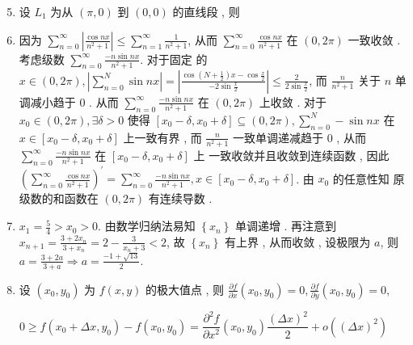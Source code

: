 \documentclass[10pt]{article}
\begin{document}
\begin{enumerate}
  \setcounter{enumi}{4}
  \item  设  $L_{1}$  为从  $(\pi, 0)$  到  $(0,0)$  的直线段 ,  则 

  \item  因为  $\sum_{n=0}^{\infty}\left|\frac{\cos n x}{n^{2}+1}\right| \leqslant \sum_{n=1}^{\infty} \frac{1}{n^{2}+1}$,  从而  $\sum_{n=0}^{\infty} \frac{\cos n x}{n^{2}+1}$  在  $(0,2 \pi)$  一致收敛 .  考虑级数  $\sum_{n=0}^{\infty} \frac{-n \sin n x}{n^{2}+1}$.  对于固定   的  $x \in(0,2 \pi),\left|\sum_{n=0}^{N} \sin n x\right|=\left|\frac{\cos \left(N+\frac{1}{2}\right) x-\cos \frac{x}{2}}{-2 \sin \frac{x}{2}}\right| \leqslant \frac{2}{2 \sin \frac{x}{2}}$,  而  $\frac{n}{n^{2}+1}$  关于  $n$  单调减小趋于  0 .  从而  $\sum_{n=0}^{\infty} \frac{-n \sin n x}{n^{2}+1}$  在  $(0,2 \pi)$  上收敛 .  对于  $x_{0} \in(0,2 \pi), \exists \delta>0$  使得  $\left[x_{0}-\delta, x_{0}+\delta\right] \subseteq(0,2 \pi), \sum_{n=0}^{N}-\sin n x$  在  $x \in\left[x_{0}-\delta, x_{0}+\delta\right]$  上一致有界 ,  而  $\frac{n}{n^{2}+1}$  一致单调递减趋于  0 ,  从而  $\sum_{n=0}^{\infty} \frac{-n \sin n x}{n^{2}+1}$  在  $\left[x_{0}-\delta, x_{0}+\delta\right]$  上   一致收敛并且收敛到连续函数 ,  因此  $\left(\sum_{n=0}^{\infty} \frac{\cos n x}{n^{2}+1}\right)^{\prime}=\sum_{n=0}^{\infty} \frac{-n \sin n x}{n^{2}+1}, x \in\left[x_{0}-\delta, x_{0}+\delta\right]$.  由  $x_{0}$  的任意性知   原级数的和函数在  $(0,2 \pi)$  有连续导数 .

  \item $x_{1}=\frac{5}{4}>x_{0}>0$.  由数学归纳法易知  $\left\{x_{n}\right\}$  单调递增 .  再注意到  $x_{n+1}=\frac{3+2 x_{n}}{3+x_{n}}=2-\frac{3}{x_{n}+3}<2$,  故  $\left\{x_{n}\right\}$  有上界 ,  从而收敛 ,  设极限为  $a$,  则  $a=\frac{3+2 a}{3+a} \Longrightarrow a=\frac{-1+\sqrt{13}}{2}$.

  \item  设  $\left(x_{0}, y_{0}\right)$  为  $f(x, y)$  的极大值点 ,  则  $\frac{\partial f}{\partial x}\left(x_{0}, y_{0}\right)=0, \frac{\partial f}{\partial y}\left(x_{0}, y_{0}\right)=0$,

\end{enumerate}
$$
0 \geqslant f\left(x_{0}+\Delta x, y_{0}\right)-f\left(x_{0}, y_{0}\right)=\frac{\partial^{2} f}{\partial x^{2}}\left(x_{0}, y_{0}\right) \frac{(\Delta x)^{2}}{2}+o\left((\Delta x)^{2}\right)
$$
\end{document}
